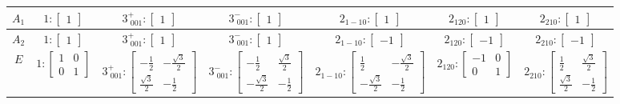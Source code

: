 \documentclass[fleqn,8pt,landscape]{jsarticle}
\begin{document}
\begin{longtable}{ccccccc}
$ A_{1} $ & $ 1:\begin{bmatrix} 1 \end{bmatrix} $ & $ 3^{+}_{\,\,001}:\begin{bmatrix} 1 \end{bmatrix} $ & $ 3^{-}_{\,\,001}:\begin{bmatrix} 1 \end{bmatrix} $ & $ 2{}_{1-10}:\begin{bmatrix} 1 \end{bmatrix} $ & $ 2{}_{120}:\begin{bmatrix} 1 \end{bmatrix} $ & $ 2{}_{210}:\begin{bmatrix} 1 \end{bmatrix} $ \\ \hline
$ A_{2} $ & $ 1:\begin{bmatrix} 1 \end{bmatrix} $ & $ 3^{+}_{\,\,001}:\begin{bmatrix} 1 \end{bmatrix} $ & $ 3^{-}_{\,\,001}:\begin{bmatrix} 1 \end{bmatrix} $ & $ 2{}_{1-10}:\begin{bmatrix} -1 \end{bmatrix} $ & $ 2{}_{120}:\begin{bmatrix} -1 \end{bmatrix} $ & $ 2{}_{210}:\begin{bmatrix} -1 \end{bmatrix} $ \\ \hline
$ E $ & $ 1:\begin{bmatrix} 1 & 0 \\ 0 & 1 \end{bmatrix} $ & $ 3^{+}_{\,\,001}:\begin{bmatrix} - \frac{1}{2} & - \frac{\sqrt{3}}{2} \\ \frac{\sqrt{3}}{2} & - \frac{1}{2} \end{bmatrix} $ & $ 3^{-}_{\,\,001}:\begin{bmatrix} - \frac{1}{2} & \frac{\sqrt{3}}{2} \\ - \frac{\sqrt{3}}{2} & - \frac{1}{2} \end{bmatrix} $ & $ 2{}_{1-10}:\begin{bmatrix} \frac{1}{2} & - \frac{\sqrt{3}}{2} \\ - \frac{\sqrt{3}}{2} & - \frac{1}{2} \end{bmatrix} $ & $ 2{}_{120}:\begin{bmatrix} -1 & 0 \\ 0 & 1 \end{bmatrix} $ & $ 2{}_{210}:\begin{bmatrix} \frac{1}{2} & \frac{\sqrt{3}}{2} \\ \frac{\sqrt{3}}{2} & - \frac{1}{2} \end{bmatrix} $ \\
\end{longtable}
\end{document}
